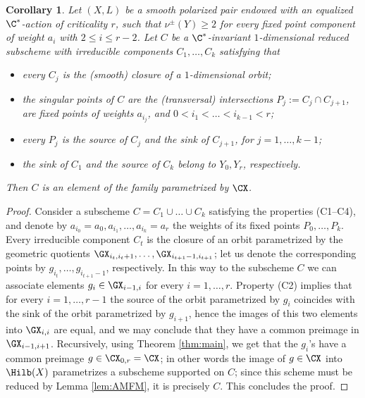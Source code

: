 \documentclass[reqno]{amsproc}
\newtheorem{corollary}[theorem]{Corollary}
\theoremstyle{definition}
\begin{document}
\begin{corollary}\label{cor:CXcontainsall}
Let $(X,L)$ be a smooth polarized pair endowed with an equalized $\C^*$-action of criticality $r$, such that $\nu^\pm(Y) \ge 2$ for every fixed point component of weight $a_i$ with $2 \le i \le r-2$.  Let $C$ be a $\C^*$-invariant $1$-dimensional reduced subscheme with irreducible components $C_1,\dots,C_k$ satisfying that 
\begin{itemize}
\item[(C1)] every $C_j$ is the (smooth) closure of a $1$-dimensional orbit; 
\item[(C2)] the singular points of $C$ are the (transversal) intersections $P_j:=C_j\cap C_{j+1}$, are fixed points of weights $a_{i_j}$, and  $0<i_1<\dots<i_{k-1}<r$; %
\item[(C3)] every $P_j$ is the source of $C_j$ and the sink of $C_{j+1}$, for $j=1,\dots,k-1$;  
\item[(C4)] the sink of $C_1$ and the source of $C_k$ belong to $Y_0,Y_r$, respectively.
\end{itemize}
Then $C$ is an element of the family parametrized by $\CX$.
\end{corollary}

\begin{proof}
Consider a subscheme $C=C_1\cup\dots \cup C_k$ satisfying the properties (C1--C4), and denote by $a_{i_0}=a_0,a_{i_1},\dots, a_{i_k}=a_r$ the weights of its fixed points $P_0,\dots,P_k$. Every irreducible component $C_t$ is the closure of an orbit parametrized by the geometric quotients $\GX_{i_t,i_t+1},\dots, \GX_{i_{t+1}-1,i_{t+1}}$; let us denote the corresponding points by $g_{i_t},\dots, g_{i_{t+1}-1}$, respectively. In this way to the subscheme $C$ we can associate elements $g_{i}\in\GX_{i-1,i}$ for every $i=1,\dots,r$. Property  (C2) implies that for every $i=1,\dots,r-1$ the source of the orbit parametrized by $g_i$ coincides with the sink of the orbit parametrized by $g_{i+1}$, hence the images of this two elements into $\GX_{i,i}$ are equal, and we may conclude that they have a common preimage in $\GX_{i-1,i+1}$. Recursively, using Theorem \ref{thm:main}, we get that the $g_i$'s have a common preimage $g\in\CX_{0,r}=\CX$; in other words the image of $g\in \CX$ into $\Hilb(X)$ parametrizes a subscheme supported on $C$; since this scheme must be reduced by Lemma \ref{lem:AMFM}, it is precisely $C$. This concludes the proof.
\end{proof}
\end{document}
